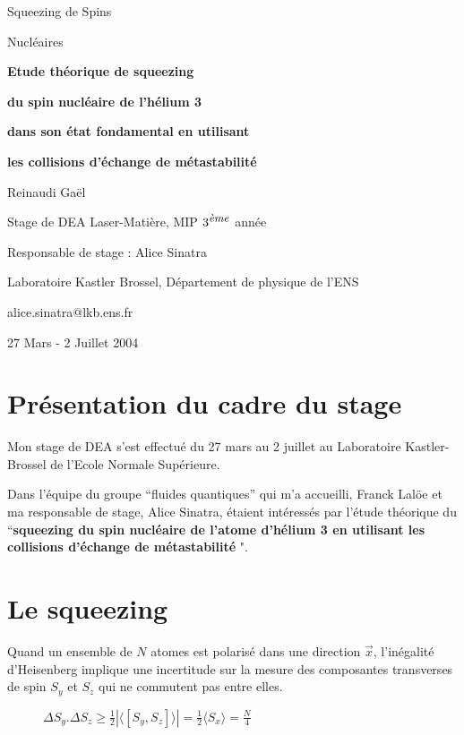 \documentclass[a4paper,10pt]{article}
\begin{document}
\centerline{\Huge{Squeezing de Spins}}
\centerline{\Huge{Nucl\'{e}aires}}

\bigskip
\bigskip
\bigskip
\bigskip
\bigskip
\bigskip
\bigskip

\centerline{\Large{\bf Etude th\'{e}orique de squeezing}}
\medskip
\centerline{\Large{\bf du spin nucl\'eaire de l'h\'{e}lium 3}}
\medskip
\centerline{\Large{\bf dans son \'etat fondamental en utilisant }}
\medskip
\centerline{\Large{\bf les collisions d'\'echange de m\'{e}tastabilit\'{e} }}

\bigskip
\bigskip
\bigskip
\bigskip
\bigskip
\bigskip
\bigskip

\centerline{\Huge{Reinaudi Ga\"{e}l}}

\bigskip
\bigskip
\bigskip
\bigskip

\centerline{\Large{Stage de DEA Laser-Mati\`{e}re, MIP $3^{\mbox{\small{\textit{\`{e}me}}}}$ ann\'{e}e}}
\bigskip
\bigskip
\bigskip
\bigskip

\centerline{\large{Responsable de stage : Alice Sinatra}}
\medskip
\centerline{\large{Laboratoire Kastler Brossel, D\'{e}partement de physique de l'ENS}}
\medskip
\centerline{\large{alice.sinatra@lkb.ens.fr}}

\bigskip
\bigskip
\bigskip
\bigskip
\bigskip
\bigskip


\centerline{\Large{27 Mars - 2 Juillet 2004}}


\newpage

\section{Pr\'{e}sentation du cadre du stage}
Mon stage de DEA s'est effectu\'{e} du 27 mars au 2 juillet au Laboratoire
Kastler-Brossel de l'Ecole Normale Sup\'{e}rieure.

Dans l'\'{e}quipe du groupe ``fluides quantiques'' qui m'a accueilli, Franck Lal\"{o}e et
ma responsable de stage, Alice Sinatra, \'{e}taient int\'{e}ress\'{e}s par l'\'{e}tude
th\'{e}orique du ``\textbf{squeezing du spin nucl\'eaire de l'atome d'h\'{e}lium 3 en
utilisant les collisions d'\'{e}change de m\'{e}tastabilit\'{e} }".

\section{Le squeezing}
Quand un ensemble de $N$ atomes est polaris\'{e} dans une direction
$\overrightarrow{x}$, l'in\'{e}galit\'{e} d'Heisenberg implique une incertitude sur la
mesure des composantes transverses de spin $S_y$ et $S_z$ qui ne commutent pas entre elles.
\begin{figure}[htb]
\begin{center}
$\Delta S_y . \Delta S_z \ge \frac{1}{2} | \langle [ S_y,S_z ] \rangle | =
\frac{1}{2} \langle S_x  \rangle = \frac{N}{4}$
\end{center}
\end{figure}
\end{document}
